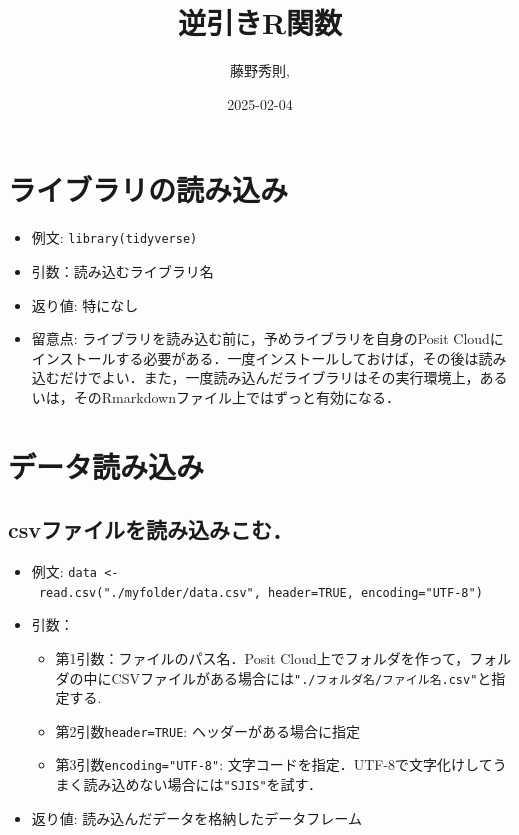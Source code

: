 \documentclass[
  xelatex, ja=standard]{bxjsarticle}
\title{逆引きR関数}
\author{藤野秀則,}
\date{2025-02-04}
\providecommand{\tightlist}{%
  \setlength{\itemsep}{0pt}\setlength{\parskip}{0pt}}
\begin{document}
\maketitle

{
\setcounter{tocdepth}{4}
\tableofcontents
}
\section{ライブラリの読み込み}\label{ux30e9ux30a4ux30d6ux30e9ux30eaux306eux8aadux307fux8fbcux307f}

\begin{itemize}
\tightlist
\item
  例文: \texttt{library(tidyverse)}
\item
  引数：読み込むライブラリ名
\item
  返り値: 特になし
\item
  留意点: ライブラリを読み込む前に，予めライブラリを自身のPosit
  Cloudにインストールする必要がある．一度インストールしておけば，その後は読み込むだけでよい．また，一度読み込んだライブラリはその実行環境上，あるいは，そのRmarkdownファイル上ではずっと有効になる．
\end{itemize}

\section{データ読み込み}\label{ux30c7ux30fcux30bfux8aadux307fux8fbcux307f}

\subsection{csvファイルを読み込みこむ．}\label{csvux30d5ux30a1ux30a4ux30ebux3092ux8aadux307fux8fbcux307fux3053ux3080}

\begin{itemize}
\tightlist
\item
  例文:
  \texttt{data\ \textless{}-\ read.csv("./myfolder/data.csv",\ header=TRUE,\ encoding="UTF-8")}
\item
  引数：

  \begin{itemize}
  \tightlist
  \item
    第1引数：ファイルのパス名．Posit
    Cloud上でフォルダを作って，フォルダの中にCSVファイルがある場合には\texttt{"./フォルダ名/ファイル名.csv"}と指定する.
  \item
    第2引数\texttt{header=TRUE}: ヘッダーがある場合に指定
  \item
    第3引数\texttt{encoding="UTF-8"}:
    文字コードを指定．UTF-8で文字化けしてうまく読み込めない場合には\texttt{"SJIS"}を試す．
  \end{itemize}
\item
  返り値: 読み込んだデータを格納したデータフレーム
\end{itemize}
\end{document}
